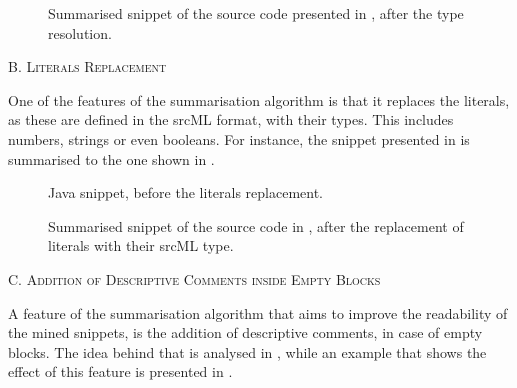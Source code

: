 \begin{figure}[H]

\vspace{-10pt}
\caption[Summarised snippet, after type resolution]{Summarised snippet of the source code presented in , after the type resolution.}
\label{listings:resolve-types-sum}
\end{figure}
\vspace{-20pt}

\clearpage

\noindent
\textsc{B. Literals Replacement}
\vspace{5pt}

One of the features of the summarisation algorithm is that it replaces the literals, as these are defined in the srcML format, with their types. This includes numbers, strings or even booleans. For instance, the snippet presented in  is summarised to the one shown in .

\begin{figure}[h]

\vspace{-10pt}
\caption[Java snippet, before literals' replacement]{Java snippet, before the literals replacement.}
\label{listings:literals-org}
\end{figure}

\vspace{-20pt}

\begin{figure}[h]

\vspace{-10pt}
\caption[Summarised snippet, after literals' replacement]{Summarised snippet of the source code in , after the replacement of literals with their srcML type.}
\label{listings:literals-sum}
\end{figure}

\noindent
\textsc{C. Addition of Descriptive Comments inside Empty Blocks}
\vspace{5pt}

A feature of the summarisation algorithm that aims to improve the readability of the mined snippets, is the addition of descriptive comments, in case of empty blocks. The idea behind that is analysed in \cite{Borges:2014}, while an example that shows the effect of this feature is presented in .

